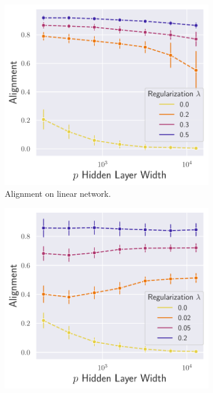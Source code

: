 \begin{figure}[h]
\centering
\begin{subfigure}[b]{.33\textwidth}
  \centering
  \includegraphics[width=\linewidth]{figures/df_lr_non_autograd_l2_v6.pdf}
  \caption{Alignment on linear network.}
  \label{fig:align_lr_non_autograd_l2}
\end{subfigure}\hfill
\begin{subfigure}[b]{.33\textwidth}
  \centering
  \includegraphics[width=\linewidth]{figures/df_nn_relu_autograd_l2_v6.pdf}

\end{subfigure}
\end{figure}
